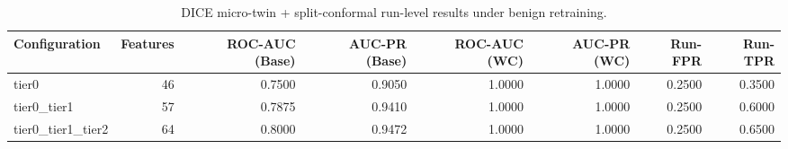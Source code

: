 \begin{table}[t]
\centering
\caption{DICE micro-twin + split-conformal run-level results under benign retraining.}
\label{tab:dice_full_overall}
\footnotesize
\begin{tabular}{lrrrrrrr}
\toprule
Configuration & Features & ROC-AUC (Base) & AUC-PR (Base) & ROC-AUC (WC) & AUC-PR (WC) & Run-FPR & Run-TPR \\
\midrule
tier0 & 46 & 0.7500 & 0.9050 & 1.0000 & 1.0000 & 0.2500 & 0.3500 \\
tier0_tier1 & 57 & 0.7875 & 0.9410 & 1.0000 & 1.0000 & 0.2500 & 0.6000 \\
tier0_tier1_tier2 & 64 & 0.8000 & 0.9472 & 1.0000 & 1.0000 & 0.2500 & 0.6500 \\
\bottomrule
\end{tabular}

\end{table}
